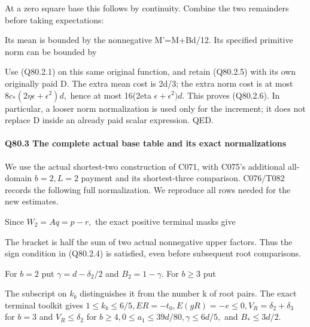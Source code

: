 At a zero square base this follows by continuity. Combine the two
remainders before taking expectations:


Its mean is bounded by the nonnegative M'=M+Bd/12. Its specified
primitive norm can be bounded by


Use (Q80.2.1) on this same original function, and retain (Q80.2.5) with
its own originally paid D. The extra mean cost is 2d/3; the extra
norm cost is at most \(8c_*(2\eta \epsilon+\epsilon^2)d,\allowbreak \) hence at most
16(2eta \(\epsilon+\epsilon^2)d.\) This proves (Q80.2.6).
 In particular, a
looser norm normalization is used only for the increment; it does
not replace D inside an already paid scalar expression. QED.

\paragraph{Q80.3 The complete actual base table and its exact normalizations}

We use the actual shortest-two construction of C071,
with C075's additional all-domain \(b=2,\allowbreak  L=2\) payment and its shortest-three
comparison. C076/T082 records the following full normalization.
We reproduce all rows needed for the new estimates.

Since \(W_2=Aq=p-r,\allowbreak \) the exact positive terminal masks give


The bracket is half the sum of two actual nonnegative upper factors.
Thus the sign condition in (Q80.2.4) is satisfied, even before subsequent
root comparisons.

For \(b=2\) put \(\gamma=d-\delta_2/2\) and \(B_2=1-\gamma.\) For \(b\ge 3\) put


The subscript on \(k_b\) distinguishes it from the number k of root pairs.
The exact terminal toolkit gives \(1\le k_b\le 6/5,\allowbreak  ER=-t_0,\allowbreak  E(gR)=-e\le 0,\allowbreak  V_R=\delta_2+\delta_3\) for \(b=3\) and \(V_R\le \delta_2\) for \(b\ge 4,\allowbreak  0\le a_1\le 39d/80,\allowbreak  \gamma\le 6d/5,\allowbreak \) and \(B_*\le 3d/2.\)

